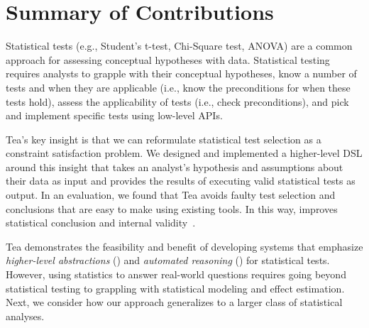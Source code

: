 \begin{comment}
Second, a usability issue with Tea's current API is its reliance of ``magic
strings.'' We are currently refactoring the API to be more object-oriented by
extending Tisane's variables data classes. We hope this revision will be more
usable with ``free'' help from existing IDEs such as VSCode that provide API
suggestions inline when specifying parameters. 

Both features will be incorporated into a new release of Tea, which I have
currently scheduled for June, 2022. 
\end{comment}

\section{Summary of Contributions} \label{sec:summaryTea}



Statistical tests (e.g., Student's t-test, Chi-Square test, ANOVA) are a common
approach for assessing conceptual hypotheses with data.
Statistical testing requires analysts to grapple with their conceptual
hypotheses, know a number of tests and when they are applicable (i.e., know the
preconditions for when these tests hold), assess the applicability of tests
(i.e., check preconditions), and pick and implement specific tests using
low-level APIs. 

Tea's key insight is that we can reformulate statistical test
selection as a constraint satisfaction problem. We designed and implemented a
higher-level DSL around this insight that takes an analyst's hypothesis and
assumptions about their data as input and provides the results of executing
valid statistical tests as output. In an evaluation, we found that Tea avoids
faulty test selection and conclusions that are easy to make using existing
tools. In this way, \tea improves statistical conclusion and internal validity~\cite{shadish2010campbell}. 

Tea demonstrates the feasibility and benefit of developing systems that
emphasize \textit{higher-level abstractions} (\thesisChallengeExplicit) and
\textit{automated reasoning} (\thesisChallengeRep) for statistical tests.
However, using statistics to answer real-world questions requires going beyond
statistical testing to grappling with statistical modeling and effect
estimation. Next, we consider how our approach generalizes to a larger class of
statistical analyses. 

